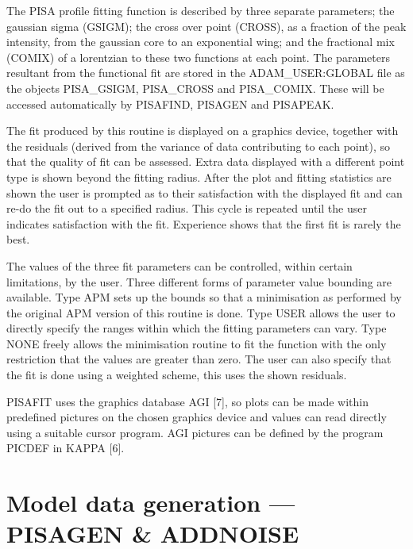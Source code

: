 The PISA profile fitting function is described by three separate
parameters; the gaussian sigma (GSIGM); the cross over point (CROSS), as
a fraction of the peak intensity, from the gaussian core to an
exponential wing; and the fractional mix (COMIX) of a lorentzian to
these two functions at each point. The  parameters resultant from the
functional fit are stored in the  ADAM\_USER:GLOBAL file as the objects
PISA\_GSIGM, PISA\_CROSS and PISA\_COMIX. These will be accessed
automatically by PISAFIND, PISAGEN  and PISAPEAK.

The fit produced by this routine is displayed on a graphics device,
together with the residuals (derived from the variance of data
contributing to each point), so that the quality of fit can be assessed.
Extra data displayed with a different point type is shown beyond the
fitting radius. After the plot and fitting statistics are shown the user
is prompted as to their satisfaction with the displayed fit and can
re-do the fit out to a specified radius. This cycle is repeated until
the user indicates satisfaction with the fit. Experience shows that the
first fit is rarely the best.

The values of the three fit parameters can be controlled, within certain
limitations, by the user. Three different forms of parameter value
bounding are available.  Type APM sets up the bounds so that a
minimisation as performed by the original APM version of this routine is
done. Type USER allows the user to directly specify the ranges within
which the fitting parameters can vary.  Type NONE freely allows the
minimisation routine to fit the function with the only restriction that
the values are greater than zero. The user can also specify that the fit
is done using a weighted scheme, this uses the shown residuals.

PISAFIT uses the graphics database AGI [7], so plots can be made within
predefined pictures on the chosen graphics device and values can read
directly using a suitable cursor program. AGI pictures can be defined by
the program PICDEF in KAPPA [6].

\section{Model data generation --- PISAGEN \& ADDNOISE}

